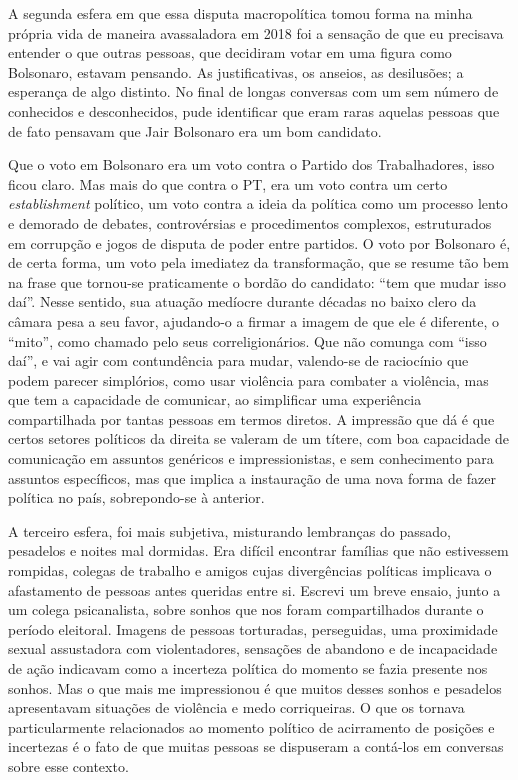 A segunda esfera em que essa disputa macropolítica tomou forma na minha
própria vida de maneira avassaladora em 2018 foi a sensação de que eu
precisava entender o que outras pessoas, que decidiram votar em uma
figura como Bolsonaro, estavam pensando. As justificativas, os anseios,
as desilusões; a esperança de algo distinto. No final de longas
conversas com um sem número de conhecidos e desconhecidos, pude
identificar que eram raras aquelas pessoas que de fato pensavam que Jair
Bolsonaro era um bom candidato.

Que o voto em Bolsonaro era um voto contra o Partido dos Trabalhadores,
isso ficou claro. Mas mais do que contra o PT, era um voto contra um
certo \emph{establishment} político, um voto contra a ideia da política
como um processo lento e demorado de debates, controvérsias e
procedimentos complexos, estruturados em corrupção e jogos de disputa de
poder entre partidos. O voto por Bolsonaro é, de certa forma, um voto
pela imediatez da transformação, que se resume tão bem na frase que
tornou-se praticamente o bordão do candidato: ``tem que mudar isso
daí''. Nesse sentido, sua atuação medíocre durante décadas no baixo
clero da câmara pesa a seu favor, ajudando-o a firmar a imagem de que
ele é diferente, o ``mito'', como chamado pelo seus correligionários.
Que não comunga com ``isso daí'', e vai agir com contundência para
mudar, valendo-se de raciocínio que podem parecer simplórios, como usar
violência para combater a violência, mas que tem a capacidade de
comunicar, ao simplificar uma experiência compartilhada por tantas
pessoas em termos diretos. A impressão que dá é que certos setores
políticos da direita se valeram de um títere, com boa capacidade de
comunicação em assuntos genéricos e impressionistas, e sem conhecimento
para assuntos específicos, mas que implica a instauração de uma nova
forma de fazer política no país, sobrepondo-se à anterior.

A terceiro esfera, foi mais subjetiva, misturando lembranças do passado,
pesadelos e noites mal dormidas. Era difícil encontrar famílias que não
estivessem rompidas, colegas de trabalho e amigos cujas divergências
políticas implicava o afastamento de pessoas antes queridas entre si.
Escrevi um breve ensaio, junto a um colega psicanalista, sobre sonhos
que nos foram compartilhados durante o período eleitoral. Imagens de
pessoas torturadas, perseguidas, uma proximidade sexual assustadora com
violentadores, sensações de abandono e de incapacidade de ação indicavam
como a incerteza política do momento se fazia presente nos sonhos. Mas o
que mais me impressionou é que muitos desses sonhos e pesadelos
apresentavam situações de violência e medo corriqueiras. O que os
tornava particularmente relacionados ao momento político de acirramento
de posições e incertezas é o fato de que muitas pessoas se dispuseram a
contá-los em conversas sobre esse contexto.

